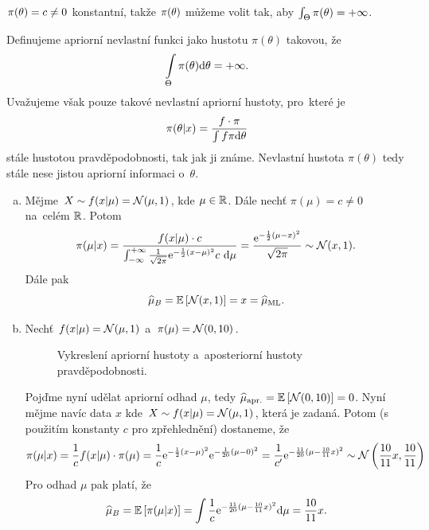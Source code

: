$\pi(\theta)=c\neq0$ konstantní, takže $\pi(\theta)$ můžeme volit tak, aby $\int_\Theta\pi(\theta)=+\infty$.
\begin{define} Definujeme apriorní nevlastní funkci jako hustotu $\pi(\theta)$ takovou, že $$ \int\limits_{\Theta}{\pi(\theta)\mathrm{d}\theta} = +\infty.$$  Uvažujeme však pouze takové nevlastní apriorní hustoty, pro~které je 
	$$\pi(\theta|x)=\frac{f\cdot \pi}{\int f\pi\mathrm{d}\theta}$$ stále hustotou pravděpodobnosti, tak jak ji známe. Nevlastní hustota $\pi(\theta)$ tedy stále nese jistou apriorní informaci o~$\theta$.
\end{define}
\begin{example}\begin{enumerate}[a)]
		\item 
	Mějme $X\sim f(x|\mu)=\mathcal{N}(\mu,1)$, kde $\mu\in\mathbb{R}$. Dále nechť $\pi(\mu)=c\neq0$ na~celém $\mathbb{R}$. Potom$$ \pi(\mu|x)=\frac{f(x|\mu)\cdot c}{\int_{-\infty}^{+\infty}\frac{1}{\sqrt{2\pi}}\mathrm{e}^{-\frac{1}{2}(x-\mu)^2}c~\mathrm{d}\mu}=\frac{\mathrm{e}^{-\frac{1}{2}(\mu-x)^2}}{\sqrt{2\pi}}\sim\mathcal{N}(x,1).$$
	Dále pak 
	$$\widehat{\mu}_B=\mathbb{E}\left[ \mathcal{N}(x,1) \right]=x=\widehat{\mu}_{\mathrm{ML}}.$$
	\item Nechť $f(x|\mu)=\mathcal{N}(\mu,1)$ a~$\pi(\mu)=\mathcal{N}(0,10)$.
	
\begin{figure}[h]
	\centering
	\caption{Vykreslení apriorní hustoty a~aposteriorní hustoty pravděpodobnosti.}
\end{figure}
	

	
	Pojďme nyní udělat apriorní odhad $\mu$, tedy $\widehat{\mu}_{\mathrm{apr.}}=\mathbb{E}\left[ \mathcal{N}(0,10) \right]=0$. Nyní mějme navíc data $x$ kde $X\sim f(x|\mu)=\mathcal{N}(\mu,1)$, která je zadaná. Potom (s použitím konstanty $c$ pro zpřehlednění) dostaneme, že
	$$ \pi(\mu|x)=\frac{1}{c}f(x|\mu)\cdot\pi(\mu)=\frac{1}{c}\mathrm{e}^{-\frac{1}{2}(x-\mu)^2}\mathrm{e}^{-\frac{1}{20}(\mu-0)^2}=\frac{1}{c'}\mathrm{e}^{-\frac{11}{20}(\mu-\frac{10}{11}x)^2}\sim \mathcal{N}\left(\frac{10}{11}x,\frac{10}{11}\right)$$ 
	Pro odhad $\mu$ pak platí, že
	$$\widehat{\mu}_B=\mathbb{E}\left[ \pi(\mu|x) \right]=\int\frac{1}{c}\mathrm{e}^{-\frac{11}{20}(\mu-\frac{10}{11}x)^2}\mathrm{d}\mu=\frac{10}{11}x.$$ 
		\end{enumerate}
\end{example}
